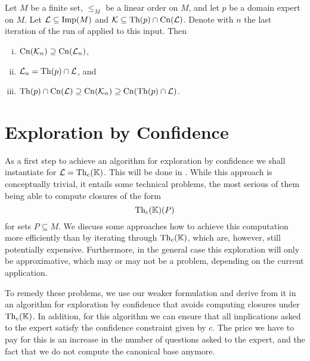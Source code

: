 \begin{Theorem}
  \label{thm:explore-implications-weaker-version-all-other-properties}
  Let $M$ be a finite set, $\leq_{M}$ be a linear order on $M$, and let $p$ be a domain
  expert on $M$.  Let $\mathcal{L} \subseteq \operatorname{Imp}(M)$ and $\mathcal{K} \subseteq \operatorname{Th}(p)
  \cap \operatorname{Cn}(\mathcal{L})$.  Denote with $n$ the last iteration of the run of
   applied to this input.  Then
  \begin{enumerate}[i. ]
  \item $\operatorname{Cn}(\mathcal{K}_{n}) \supseteq \operatorname{Cn}(\mathcal{L}_{n})$,
  \item $\mathcal{L}_{n} = \operatorname{Th}(p) \cap \mathcal{L}$, and
  \item $\operatorname{Th}(p) \cap \operatorname{Cn}(\mathcal{L}) \supseteq \operatorname{Cn}(\mathcal{K}_{n}) \supseteq \operatorname{Cn}(\operatorname{Th}(p) \cap \mathcal{L})$.
  \end{enumerate}
\end{Theorem}

\section{Exploration by Confidence}
\label{sec:expl-conf}

As a first step to achieve an algorithm for exploration by confidence we shall instantiate
 for $\mathcal{L} = \operatorname{Th}_{c}({\mathbb{K}})$.  This will be done in
.  While this approach is conceptually trivial, it entails some
technical problems, the most serious of them being able to compute closures of the form
\begin{equation*}
  \operatorname{Th}_{c}({\mathbb{K}})(P)
\end{equation*}
for sets $P \subseteq M$.  We discuss some approaches how to achieve this computation more
efficiently than by iterating through $\operatorname{Th}_{c}({\mathbb{K}})$, which are, however, still
potentially expensive.  Furthermore, in the general case this exploration will only be
approximative, which may or may not be a problem, depending on the current application.

To remedy these problems, we use our weaker formulation
 and derive from it in
 an algorithm for exploration by confidence that avoids computing
closures under $\operatorname{Th}_{c}({\mathbb{K}})$.  In addition, for this algorithm we can ensure that all
implications asked to the expert satisfy the confidence constraint given by $c$.  The
price we have to pay for this is an increase in the number of questions asked to the
expert, and the fact that we do not compute the canonical base anymore.

